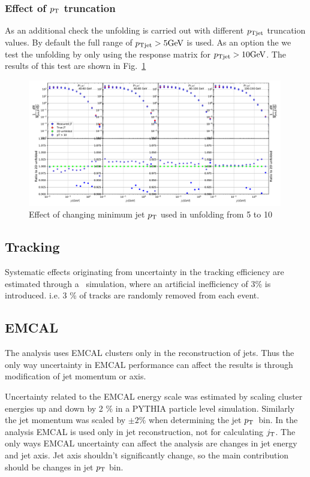 \subsubsection{Effect of $p_{\rm T}$ truncation}
\label{sec:truncation}
As an additional check the unfolding is carried out with different $p_{\rm Tjet}$ truncation values. By default the full range of $p_{\rm Tjet} > 5 \mathrm{GeV}\kern-0.05em$ is used. As an option the we test the unfolding by only using the response matrix for $p_{\rm Tjet} > 10 \mathrm{GeV}\kern-0.05em$. The results of this test are shown in Fig.~\ref{fig:truncation}

\begin{figure}
\includegraphics[width=0.99\textwidth]{figures/systematics/PtCutComparison10.pdf}
\caption{Effect of changing minimum jet $p_{\rm T}$ used in unfolding from 5 to 10 \gev}
\label{fig:truncation}
\end{figure}


  
  
  \subsection{Tracking}
 Systematic effects originating from uncertainty in the tracking efficiency are estimated through a \pythia~simulation, where an artificial inefficiency of 3\% is introduced. i.e. 3 \% of tracks are randomly removed from each event. 
  \subsection{EMCAL}
  The analysis uses EMCAL clusters only in the reconstruction of jets. Thus the only way uncertainty in EMCAL performance can affect the results is through modification of jet momentum or axis.
  
  Uncertainty related to the EMCAL energy scale was estimated by scaling cluster energies up and down by 2 \% in a PYTHIA particle level simulation. Similarly the jet momentum was scaled by $\pm 2\%$ when determining the jet $p_{\rm T}$ bin. In the analysis EMCAL is used only in jet reconstruction, not for calculating $j_{\rm T}$. The only ways EMCAL uncertainty can affect the analysis are changes in jet energy and jet axis. Jet axis shouldn't significantly change, so the main contribution should be changes in jet $p_{\rm T}$ bin.

